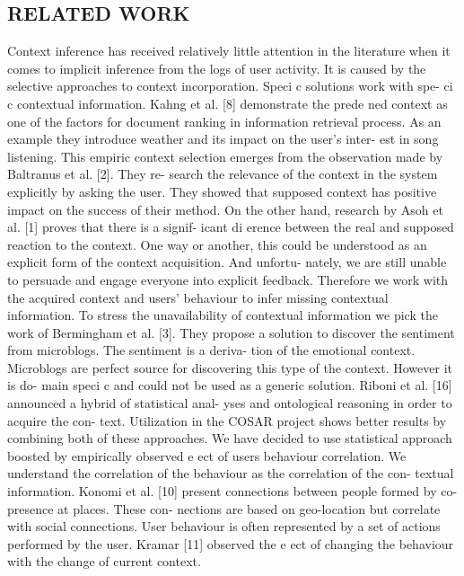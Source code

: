 \documentclass[10pt]{extarticle}
\begin{document}
\begin{multicols}{2}
\section{RELATED WORK} 

Context  inference  has  received  relatively  little  attention
in the literature when it comes to implicit inference from the
logs of user activity.  It is caused by the selective approaches
to context incorporation.  Speci c solutions work with spe-
ci c contextual information.  Kahng et al. [8] demonstrate
the  prede ned  context  as  one  of  the  factors  for  document
ranking  in  information  retrieval  process.   As  an  example
they introduce weather and its impact on the user's inter-
est in song listening.  This empiric context selection emerges
from the observation made by Baltranus et al. [2].  They re-
search the relevance of the context in the system explicitly
by asking the user.  They showed that supposed context has
positive impact on the success of their method. On the other
hand, research by Asoh et al. [1] proves that there is a signif-
icant di erence between the real and supposed reaction to
the context.  One way or another, this could be understood
as an explicit form of the context acquisition.  And unfortu-
nately, we are still unable to persuade and engage everyone
into explicit feedback.
Therefore we work with the acquired context and users'
behaviour to infer missing contextual information.  To stress
the unavailability of contextual information we pick the work
of Bermingham et al. [3]. They propose a solution to discover
the sentiment from microblogs.  The sentiment is a deriva-
tion of the emotional context.  Microblogs are perfect source
for discovering this type of the context.  However it is do-
main speci c and could not be used as a generic solution.
Riboni et al. [16] announced a hybrid of statistical anal-
yses and ontological reasoning in order to acquire the con-
text.  Utilization in the COSAR project shows better results
by  combining  both  of  these  approaches.   We  have  decided
to use statistical approach boosted by empirically observed
e ect  of  users  behaviour  correlation.   We  understand  the
correlation  of  the  behaviour  as  the  correlation  of  the  con-
textual information.  Konomi et al. [10] present connections
between people formed by co-presence at places.  These con-
nections are based on geo-location but correlate with social
connections.
User  behaviour  is  often  represented  by  a  set  of  actions
performed by the user.  Kramar [11] observed the e ect of
changing the behaviour with the change of current context.

\end{multicols}
\end{document}
